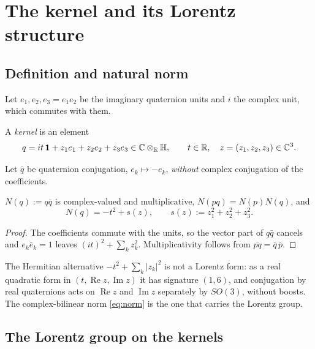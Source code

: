 \section{The kernel and its Lorentz structure}\label{sec:kernel}

\subsection{Definition and natural norm}

Let \(e_1,e_2,e_3=e_1e_2\) be the imaginary quaternion units and \(i\) the complex unit, which commutes with them.

\begin{definition}[Kernel]\label{def:kernel}
A \emph{kernel} is an element
\begin{equation}\label{eq:kernel}
q = it\,\mathbf 1 + z_1e_1+z_2e_2+z_3e_3 \in \mathbb C\otimes_{\mathbb R}\mathbb H,
\qquad t\in\mathbb R,\quad z=(z_1,z_2,z_3)\in\mathbb C^3 .
\end{equation}
\end{definition}

Let \(\bar q\) be quaternion conjugation, \(e_k\mapsto-e_k\), \emph{without} complex conjugation of the coefficients.

\begin{proposition}\label{prop:norm}
\(N(q):=q\bar q\) is complex-valued and multiplicative, \(N(pq)=N(p)N(q)\), and
\begin{equation}\label{eq:norm}
N(q)=-t^2+s(z),\qquad s(z):=z_1^2+z_2^2+z_3^2 .
\end{equation}
\end{proposition}

\begin{proof}
The coefficients commute with the units, so the vector part of \(q\bar q\) cancels and \(e_k\bar e_k=1\) leaves \((it)^2+\sum_kz_k^2\).
Multiplicativity follows from \(\overline{pq}=\bar q\,\bar p\).
\end{proof}

The Hermitian alternative \(-t^2+\sum_k|z_k|^2\) is not a Lorentz form: as a real quadratic form in \((t,\operatorname{Re}z,\operatorname{Im}z)\)
it has signature \((1,6)\), and conjugation by real quaternions acts on \(\operatorname{Re}z\) and \(\operatorname{Im}z\) separately by
\(SO(3)\), without boosts.  The complex-bilinear norm \eqref{eq:norm} is the one that carries the Lorentz group.

\subsection{The Lorentz group on the kernels}

